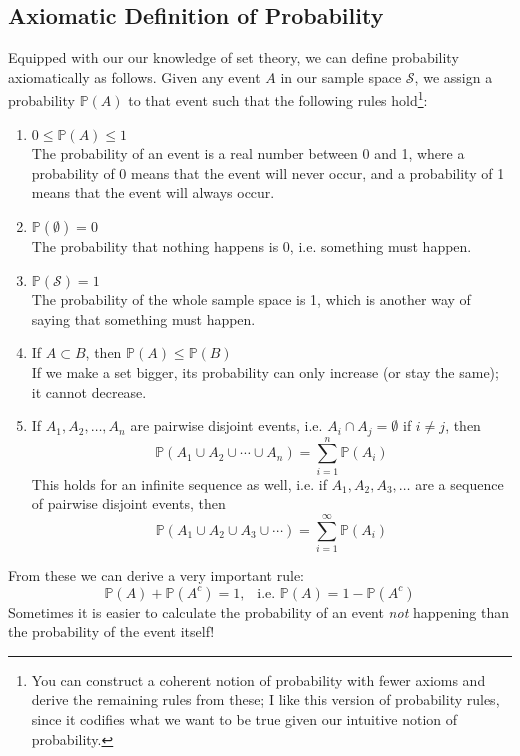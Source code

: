 \documentclass[12pt]{article}
\theoremstyle{definition}
\theoremstyle{remark}
\def\P{{\mathbb P}}
\def\cals{{\mathcal S}}
\begin{document}
\subsection{Axiomatic Definition of Probability}
Equipped with our our knowledge of set theory, we can define probability axiomatically as follows. Given any event $A$ in our sample space $\cals$, we assign a probability $\P(A)$ to that event such that the following rules hold\footnote{You can construct a coherent notion of probability with fewer axioms and derive the remaining rules from these; I like this version of probability rules, since it codifies what we want to be true given our intuitive notion of probability.}:
\begin{enumerate}
\item $0 \leq \P(A) \leq 1$ \\

The probability of an event is a real number between 0 and 1, where a probability of 0 means that the event will never occur, and a probability of 1 means that the event will always occur.
\item $\P(\emptyset) = 0$ \\

The probability that nothing happens is 0, i.e. something must happen.
\item $\P(\cals) = 1$ \\

The probability of the whole sample space is 1, which is another way of saying that something must happen.
\item If $A \subset B$, then $\P(A) \leq \P(B)$ \\

If we make a set bigger, its probability can only increase (or stay the same); it cannot decrease.

\item If $A_1, A_2, \dots, A_n$ are pairwise disjoint events, i.e. $A_i \cap A_j = \emptyset$ if $i \neq j$, then
\[
\P(A_1 \cup A_2 \cup \cdots \cup A_n) = \sum_{i=1}^n \P(A_i)
\]
This holds for an infinite sequence as well, i.e. if $A_1, A_2, A_3, \dots$ are a sequence of pairwise disjoint events, then 
\[
\P(A_1 \cup A_2 \cup A_3 \cup \cdots) = \sum_{i=1}^\infty \P(A_i)
\]
\end{enumerate}

From these we can derive a very important rule:
\[
\P(A) + \P(A^c) = 1, \:\:\text{ i.e. }\P(A) = 1 - \P(A^c)
\]
Sometimes it is easier to calculate the probability of an event \emph{not} happening than the probability of the event itself!\\
\end{document}
